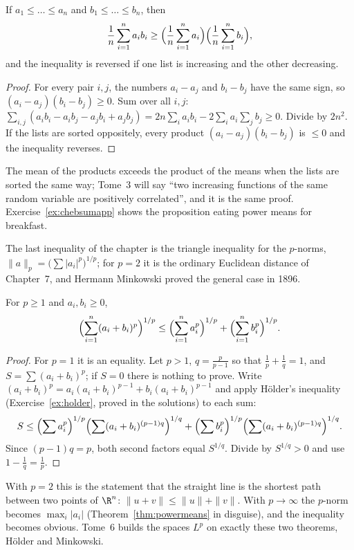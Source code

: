 \begin{proposition}\label{prop:chebsum}
If $a_1\le\dots\le a_n$ and $b_1\le\dots\le b_n$, then
\[
\frac1n\sum_{i=1}^na_ib_i\ge\Bigl(\frac1n\sum_{i=1}^na_i\Bigr)\Bigl(\frac1n\sum_{i=1}^nb_i\Bigr),
\]
and the inequality is reversed if one list is increasing and the other decreasing.
\end{proposition}
\begin{proof}
For every pair $i,j$, the numbers $a_i-a_j$ and $b_i-b_j$ have the same sign, so $(a_i-a_j)(b_i-b_j)\ge0$. Sum over all $i,j$:
$\sum_{i,j}(a_ib_i-a_ib_j-a_jb_i+a_jb_j)=2n\sum_ia_ib_i-2\sum_ia_i\sum_jb_j\ge0$. Divide by $2n^2$. If the lists are sorted oppositely, every
product $(a_i-a_j)(b_i-b_j)$ is $\le0$ and the inequality reverses.
\end{proof}

The mean of the products exceeds the product of the means when the lists are sorted the same way; Tome~3 will say ``two increasing functions of
the same random variable are positively correlated'', and it is the same proof. Exercise~\ref{ex:chebsumapp} shows the proposition eating power means
for breakfast.

The last inequality of the chapter is the triangle inequality for the $p$-norms, $\|a\|_p=\bigl(\sum|a_i|^p\bigr)^{1/p}$; for $p=2$ it is the
ordinary Euclidean distance of Chapter~7, and Hermann Minkowski proved the general case in 1896.

\begin{theorem}[Minkowski]\label{thm:minkowski}
For $p\ge1$ and $a_i,b_i\ge0$,
\[
\Bigl(\sum_{i=1}^n(a_i+b_i)^p\Bigr)^{1/p}\le\Bigl(\sum_{i=1}^na_i^p\Bigr)^{1/p}+\Bigl(\sum_{i=1}^nb_i^p\Bigr)^{1/p}.
\]
\end{theorem}
\begin{proof}
For $p=1$ it is an equality. Let $p>1$, $q=\frac p{p-1}$ so that $\frac1p+\frac1q=1$, and $S=\sum(a_i+b_i)^p$; if $S=0$ there is nothing to prove. Write
$(a_i+b_i)^p=a_i(a_i+b_i)^{p-1}+b_i(a_i+b_i)^{p-1}$ and apply H\"older's inequality (Exercise~\ref{ex:holder}, proved in the solutions) to each sum:
\[
S\le\Bigl(\sum a_i^p\Bigr)^{1/p}\Bigl(\sum(a_i+b_i)^{(p-1)q}\Bigr)^{1/q}+\Bigl(\sum b_i^p\Bigr)^{1/p}\Bigl(\sum(a_i+b_i)^{(p-1)q}\Bigr)^{1/q}.
\]
Since $(p-1)q=p$, both second factors equal $S^{1/q}$. Divide by $S^{1/q}>0$ and use $1-\frac1q=\frac1p$.
\end{proof}

With $p=2$ this is the statement that the straight line is the shortest path between two points of $\R^n$: $\|u+v\|\le\|u\|+\|v\|$. With $p\to\infty$
the $p$-norm becomes $\max_i|a_i|$ (Theorem~\ref{thm:powermeans} in disguise), and the inequality becomes obvious. Tome~6 builds the spaces $L^p$
on exactly these two theorems, H\"older and Minkowski.


